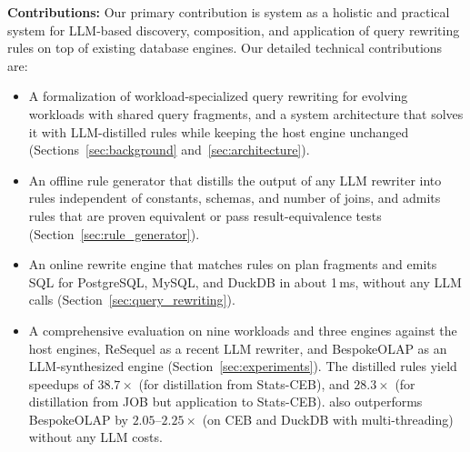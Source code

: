 \textbf{Contributions:} Our primary contribution is {\sys} system as a holistic and practical system for LLM-based discovery, composition, and application of query rewriting rules on top of existing database engines.
%
Our detailed technical contributions are:\shorten
\begin{itemize}
\item A formalization of workload-specialized query rewriting for evolving workloads with shared query fragments, and a system architecture that solves it with LLM-distilled rules while keeping the host engine unchanged (Sections~\ref{sec:background} and~\ref{sec:architecture}).
\item An offline rule generator that distills the output of any LLM rewriter into rules independent of constants, schemas, and number of joins, and admits rules that are proven equivalent or pass result-equivalence tests (Section~\ref{sec:rule_generator}).
\item An online rewrite engine that matches rules on plan fragments and emits SQL for PostgreSQL, MySQL, and DuckDB in about 1\,ms, without any LLM calls (Section~\ref{sec:query_rewriting}).
\item A comprehensive evaluation on nine workloads and three engines against the host engines, ReSequel as a recent LLM rewriter, and BespokeOLAP as an LLM-synthesized engine (Section~\ref{sec:experiments}). The distilled rules yield speedups of $38.7\times$ (for distillation from Stats-CEB), and $28.3\times$ (for distillation from JOB but application to Stats-CEB). {\sys} also outperforms BespokeOLAP by $2.05$--$2.25\times$ (on CEB and DuckDB with multi-threading) without any LLM costs.
\end{itemize}